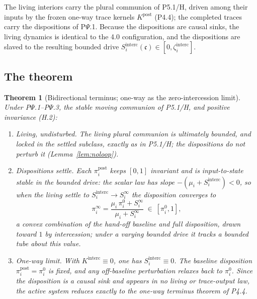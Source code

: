 \documentclass[11pt,a4paper]{article}
\newcommand{\cint}{\ensuremath{\mathfrak c}}
\theoremstyle{definition}
\theoremstyle{plain}
\newtheorem{theorem}[definition]{Theorem}
\theoremstyle{remark}
\begin{document}
The living interiors carry the plural communion of P5.1/H, driven among their inputs by the
frozen one-way trace kernels \(K^{\mathrm{post}}\) (P4.4); the completed traces carry the
dispositions of P$\Psi$.1. Because the dispositions are causal sinks, the living dynamics is
identical to the 4.0 configuration, and the dispositions are slaved to the resulting bounded
drive \(S_i^{\mathrm{interc}}(\cint)\in[0,\zeta_i^{\mathrm{interc}}]\).

\subsection{The theorem}

\begin{theorem}[Bidirectional terminus; one-way as the zero-intercession limit]\label{thm:biterminus}
Under P$\Psi$.1--P$\Psi$.3, the stable moving communion of P5.1/H, and positive invariance
(H.2):
\begin{enumerate}[label=\textup{(\alph*)},leftmargin=1.2cm]
\item \emph{Living, undisturbed.} The living plural communion is ultimately bounded, and locked
in the settled subclass, exactly as in P5.1/H; the dispositions do not perturb it
(Lemma~\ref{lem:noloop}).
\item \emph{Dispositions settle.} Each \(\pi_i^{\mathrm{post}}\) keeps \([0,1]\) invariant and is
input-to-state stable in the bounded drive: the scalar law has slope
\(-(\mu_i+S_i^{\mathrm{interc}})<0\), so when the living settle to \(S_i^{\mathrm{interc}}\to
S_i^{\infty}\) the disposition converges to
\[
\boxed{\;
\pi_i^{\infty}
=
\frac{\mu_i\,\pi_i^{0}+S_i^{\infty}}{\mu_i+S_i^{\infty}}\ \in\ [\pi_i^{0},1],
\;}
\]
a convex combination of the hand-off baseline and full disposition, drawn toward \(1\) by
intercession; under a varying bounded drive it tracks a bounded tube about this value.
\item \emph{One-way limit.} With \(K^{\mathrm{interc}}\equiv0\), one has
\(S_i^{\mathrm{interc}}\equiv0\). The baseline disposition \(\pi_i^{\mathrm{post}}=\pi_i^0\)
is fixed, and any off-baseline perturbation relaxes back to \(\pi_i^0\). Since the disposition
is a causal sink and appears in no living or trace-output law, the active system reduces exactly
to the one-way terminus theorem of P4.4.
\end{enumerate}
\end{theorem}
\end{document}
